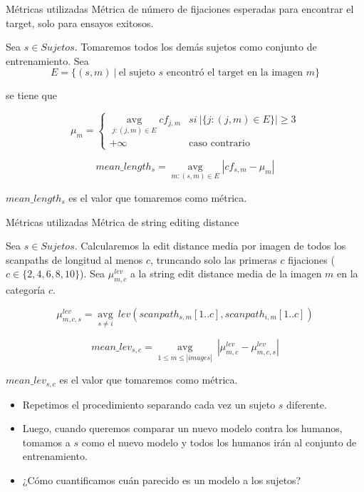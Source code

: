 \documentclass[compress]{beamer}
\DeclareMathOperator*{\avg}{avg}
\begin{document}
\begin{frame}{Métricas utilizadas}
{Métrica de número de fijaciones esperadas para
encontrar el target, solo para ensayos exitosos.}

Sea $s \in Sujetos$. Tomaremos todos los demás sujetos como conjunto de entrenamiento. Sea $$ E = \{(s,m) \ | \ \text{el sujeto $s$ encontró el target en la imagen $m$}\}$$

se tiene que

$$ \mu_m
= \left\{ \begin{array}{lc}
             \avg\limits_{j:(j,m) \in E} cf_{j,m} &  si \ |\{j:(j,m) \in E\}| \geq 3 \\
             +\infty &  \text{caso contrario}
          \end{array}
   \right.$$

$$mean\_length_s = \avg\limits_{m:(s,m) \in E} |cf_{s,m} - \mu_m| $$

$mean\_length_s$ es el valor que tomaremos como métrica.
\end{frame}

\begin{frame}{Métricas utilizadas}
{Métrica de string editing distance}

Sea $s \in Sujetos$. Calcularemos la edit distance media por imagen de todos los scanpaths de longitud al menos $c$, truncando solo las primeras $c$ fijaciones ($c \in \{2,4,6,8,10\}$). Sea $\mu_{m,c}^{lev}$ a la string edit distance media de la imagen $m$ en la categoría $c$.

$$\mu_{m,c,s}^{lev} = \avg\limits_{s \neq i} \ lev(scanpath_{s,m}[1..c], scanpath_{i,m}[1..c])$$

$$mean\_lev_{s,c} = \avg\limits_{1 \leq m \leq |images|} \ |\mu_{m,c}^{lev} - \mu_{m,c,s}^{lev}|$$

$mean\_lev_{s,c}$ es el valor que tomaremos como métrica.
\end{frame}

\begin{frame}
\begin{itemize}
\item Repetimos el procedimiento separando cada vez un sujeto $s$ diferente.
\item Luego, cuando queremos comparar un nuevo modelo contra los humanos, tomamos a $s$ como el nuevo modelo y todos los humanos irán al conjunto de entrenamiento.
\item ¿Cómo cuantificamos cuán parecido es un modelo a los sujetos?
\end{itemize}
\end{frame}
\end{document}
